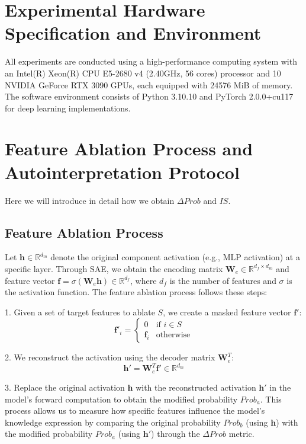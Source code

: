 \section{Experimental Hardware Specification and Environment}
All experiments are conducted using a high-performance computing system with an Intel(R) Xeon(R) CPU E5-2680 v4 (2.40GHz, 56 cores) processor and 10 NVIDIA GeForce RTX 3090 GPUs, each equipped with 24576 MiB of memory. The software environment consists of Python 3.10.10 and PyTorch 2.0.0+cu117 for deep learning implementations.

\section{Feature Ablation Process and Autointerpretation Protocol}
\label{section:appendix:Autointerpretation Protocol}

Here we will introduce in detail how we obtain $\Delta Prob$ and $IS$.
\subsection{Feature Ablation Process}

\label{subsection:appendix:Feature Ablation Proces}
Let $\mathbf{h} \in \mathbb{R}^{d_m}$ denote the original component activation (e.g., MLP activation) at a specific layer. Through SAE, we obtain the encoding matrix $\mathbf{W}_e \in \mathbb{R}^{d_f \times d_m}$ and feature vector $\mathbf{f} = \sigma(\mathbf{W}_e\mathbf{h}) \in \mathbb{R}^{d_f}$, where $d_f$ is the number of features and $\sigma$ is the activation function.
The feature ablation process follows these steps:

1. Given a set of target features to ablate $S$, we create a masked feature vector $\mathbf{f}'$:
\begin{equation}
   \mathbf{f}'_i = \begin{cases} 
   0 & \text{if } i \in S \\
   \mathbf{f}_i & \text{otherwise}
   \end{cases}
\end{equation}

2. We reconstruct the activation using the decoder matrix $\mathbf{W}^T_e$:
   \begin{equation}
   \mathbf{h}' = \mathbf{W}^T_e\mathbf{f}' \in \mathbb{R}^{d_m}
\end{equation}

3. Replace the original activation $\mathbf{h}$ with the reconstructed activation $\mathbf{h}'$ in the model's forward computation to obtain the modified probability $Prob_a$.
This process allows us to measure how specific features influence the model's knowledge expression by comparing the original probability $Prob_b$ (using $\mathbf{h}$) with the modified probability $Prob_a$ (using $\mathbf{h}'$) through the $\Delta Prob$ metric.


